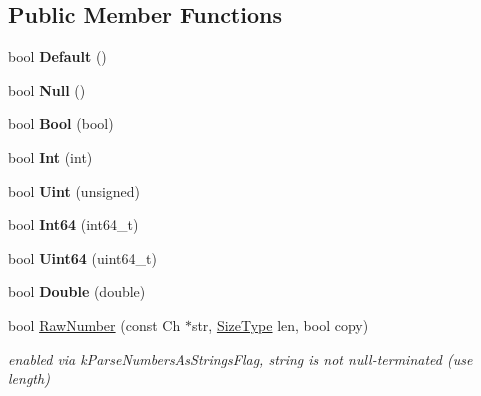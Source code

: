 \subsection*{Public Member Functions}
\begin{DoxyCompactItemize}
\item 
\mbox{\label{struct_base_reader_handler_a836437f6ccc37f08ff933f009b18a78c}} 
bool {\bfseries Default} ()
\item 
\mbox{\label{struct_base_reader_handler_ae2ebbde4628bf3659ddc5d18520935f5}} 
bool {\bfseries Null} ()
\item 
\mbox{\label{struct_base_reader_handler_aa1c3ce42dbb856b3349792dc9d963587}} 
bool {\bfseries Bool} (bool)
\item 
\mbox{\label{struct_base_reader_handler_a85e813aaf7189a2f87bd53953324fafc}} 
bool {\bfseries Int} (int)
\item 
\mbox{\label{struct_base_reader_handler_a0e683306cbb7b4e350a35c18c5246f2a}} 
bool {\bfseries Uint} (unsigned)
\item 
\mbox{\label{struct_base_reader_handler_a04011733ea584739c97ad5c6afa15a35}} 
bool {\bfseries Int64} (int64\+\_\+t)
\item 
\mbox{\label{struct_base_reader_handler_a351aa3cd81856a487c21022e9cc64d2b}} 
bool {\bfseries Uint64} (uint64\+\_\+t)
\item 
\mbox{\label{struct_base_reader_handler_a8156ea6ae5b8cd23a8b700e92a8af1eb}} 
bool {\bfseries Double} (double)
\item 
\mbox{\label{struct_base_reader_handler_a9ed0d83d5e6c8f5e4b32ca3735ff0bb7}} 
bool \hyperlink{struct_base_reader_handler_a9ed0d83d5e6c8f5e4b32ca3735ff0bb7}{Raw\+Number} (const Ch $\ast$str, \hyperlink{rapidjson_8h_a5ed6e6e67250fadbd041127e6386dcb5}{Size\+Type} len, bool copy)
\begin{DoxyCompactList}\small\item\em enabled via k\+Parse\+Numbers\+As\+Strings\+Flag, string is not null-\/terminated (use length) \end{DoxyCompactList}\item 

\end{DoxyCompactItemize}
